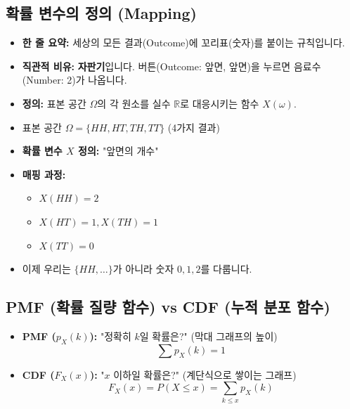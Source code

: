 \documentclass[11pt,a4paper]{book}
\theoremstyle{definition}
\begin{document}
\subsection{확률 변수의 정의 (Mapping)}
\begin{conceptbox}[title={Outcome $\to$ Number 변환기}]
\begin{itemize}
    \item \textbf{한 줄 요약:} 세상의 모든 결과(Outcome)에 꼬리표(숫자)를 붙이는 규칙입니다.
    \item \textbf{직관적 비유:} \textbf{자판기}입니다. 버튼(Outcome: 앞면, 앞면)을 누르면 음료수(Number: 2)가 나옵니다.
    \item \textbf{정의:} 표본 공간 $\Omega$의 각 원소를 실수 $\mathbb{R}$로 대응시키는 함수 $X(\omega)$.
\end{itemize}
\end{conceptbox}

\begin{examplebox}[title={동전 2개 던지기}]
\begin{itemize}
    \item 표본 공간 $\Omega = \{ HH, HT, TH, TT \}$ (4가지 결과)
    \item \textbf{확률 변수 $X$ 정의:} "앞면의 개수"
    \item \textbf{매핑 과정:}
    \begin{itemize}
        \item $X(HH) = 2$
        \item $X(HT) = 1, X(TH) = 1$
        \item $X(TT) = 0$
    \end{itemize}
    \item 이제 우리는 $\{HH, \dots\}$가 아니라 숫자 $0, 1, 2$를 다룹니다.
\end{itemize}
\end{examplebox}

\subsection{PMF (확률 질량 함수) vs CDF (누적 분포 함수)}

\begin{itemize}
    \item \textbf{PMF ($p_X(k)$):} "정확히 $k$일 확률은?" (막대 그래프의 높이)
        \[ \sum p_X(k) = 1 \]
    \item \textbf{CDF ($F_X(x)$):} "$x$ 이하일 확률은?" (계단식으로 쌓이는 그래프)
        \[ F_X(x) = P(X \le x) = \sum_{k \le x} p_X(k) \]
\end{itemize}
\end{document}
